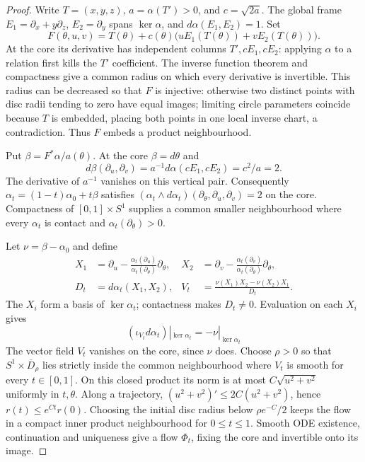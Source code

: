 \begin{proof}
Write $T=(x,y,z)$, $a=\alpha(T')>0$, and $c=\sqrt{2a}$.
The global frame $E_1=\partial_x+y\partial_z$, $E_2=\partial_y$ spans
$\ker\alpha$, and $d\alpha(E_1,E_2)=1$. Set
\begin{equation}
 F(\theta,u,v)=T(\theta)+c(\theta)
       \bigl(uE_1(T(\theta))+vE_2(T(\theta))\bigr).
\end{equation}
At the core its derivative has independent columns $T',cE_1,cE_2$:
applying $\alpha$ to a relation first kills the $T'$ coefficient.
The inverse function theorem and compactness give a common radius on
which every derivative is invertible. This radius can be decreased so
that $F$ is injective: otherwise two distinct points with disc radii
tending to zero have equal images; limiting circle parameters coincide
because $T$ is embedded, placing both points in one local inverse chart,
a contradiction. Thus $F$ embeds a product neighbourhood.

Put $\beta=F^*\alpha/a(\theta)$. At the core $\beta=d\theta$ and
\begin{equation}
 d\beta(\partial_u,\partial_v)
 =a^{-1}d\alpha(cE_1,cE_2)=c^2/a=2.
\end{equation}
The derivative of $a^{-1}$ vanishes on this vertical pair. Consequently
$\alpha_t=(1-t)\alpha_0+t\beta$ satisfies
$(\alpha_t\wedge d\alpha_t)(\partial_\theta,\partial_u,\partial_v)=2$
on the core. Compactness of $[0,1]\times S^1$ supplies a common smaller
neighbourhood where every $\alpha_t$ is contact and
$\alpha_t(\partial_\theta)>0$.

Let $\nu=\beta-\alpha_0$ and define
\begin{align}
 X_1&=\partial_u-
   \frac{\alpha_t(\partial_u)}{\alpha_t(\partial_\theta)}\partial_\theta,
 &X_2&=\partial_v-
   \frac{\alpha_t(\partial_v)}{\alpha_t(\partial_\theta)}\partial_\theta,
 \\
 D_t&=d\alpha_t(X_1,X_2),
 &V_t&=\frac{\nu(X_1)X_2-\nu(X_2)X_1}{D_t}.
\end{align}
The $X_i$ form a basis of $\ker\alpha_t$; contactness makes $D_t\ne0$.
Evaluation on each $X_i$ gives
\begin{equation}
(\iota_{V_t}d\alpha_t)|_{\ker\alpha_t}=-\nu|_{\ker\alpha_t}
\end{equation}
The vector field $V_t$ vanishes on the core, since $\nu$ does.
Choose $\rho>0$ so that $S^1\times\overline D_\rho$ lies strictly
inside the common neighbourhood where $V_t$ is smooth for every
$t\in[0,1]$. On this closed product its norm is at most
$C\sqrt{u^2+v^2}$ uniformly in $t,\theta$. Along a trajectory,
$(u^2+v^2)'\leq2C(u^2+v^2)$, hence
$r(t)\leq e^{Ct}r(0)$. Choosing the initial disc radius below
$\rho e^{-C}/2$ keeps the flow in a compact inner product neighbourhood
for $0\leq t\leq1$. Smooth ODE existence, continuation and uniqueness
give a flow $\Phi_t$, fixing the core and invertible onto its image.


\end{proof}
